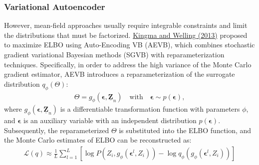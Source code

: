 \documentclass[12pt,a4paper]{article}
\begin{document}
\subsubsection{Variational Autoencoder}
However, mean-field approaches usually require integrable constraints and limit the distributions that must be factorized. \hyperref[kingma2013]{Kingma and Welling (2013)} proposed to maximize ELBO using Auto-Encoding VB (AEVB), which combines stochastic gradient variational Bayesian methods (SGVB) with reparameterization techniques. Specifically, in order to address the high variance of the Monte Carlo gradient estimator, AEVB introduces a reparameterization of the surrogate distribution $q_{\phi}(\Theta)$:
\begin{align*}
\Theta = g_{\phi}(\bm{\epsilon}, \underline{\mathbf{Z}}_n) \quad \text{with} \quad \bm{\epsilon} \sim p(\bm{\epsilon}),
\end{align*}
where $g_{\phi}(\bm{\epsilon}, \underline{\mathbf{Z}}_n)$ is a differentiable transformation function with parameters $\phi$, and $\bm{\epsilon}$ is an auxiliary variable with an independent distribution $p(\bm{\epsilon})$. Subsequently, the reparameterized $\Theta$ is substituted into the ELBO function, and the Monte Carlo estimates of ELBO can be reconstructed as:
\begin{align*}
\mathcal{L}(q) \approx \frac{1}{L} \sum_{l=1}^{L} \left[\log P(Z_i, g_{\phi}(\bm{\epsilon}^l, Z_i)) - \log q_{\phi} (g_{\phi}(\bm{\epsilon}^l, Z_i))\right]
\end{align*}
\end{document}
